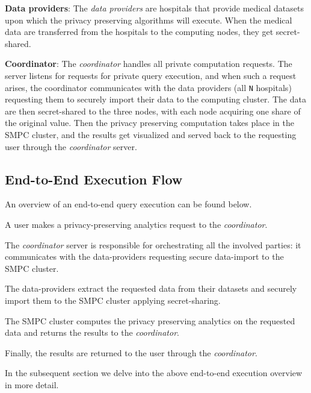 \textbf{Data providers}: The \textit{data providers} are hospitals that provide medical datasets upon which the privacy preserving algorithms will execute.
When the medical data are transferred from the hospitals to the computing nodes, they get secret\hyp shared.


\textbf{Coordinator}: The \textit{coordinator} handles all private computation requests.
The server listens for requests for private query execution, and when such a request arises, the coordinator communicates with the data providers (all \texttt{N} hospitals) requesting them to securely import their data to the computing cluster.
The data are then secret\hyp shared to the three nodes, with each node acquiring one share of the original value.
Then the privacy preserving computation takes place in the SMPC cluster, and the results get visualized and served back to the requesting user through the \textit{coordinator} server.


\subsection{End-to-End Execution Flow}\label{ss:end-to-end-execution-flow}

An overview of an end\hyp to\hyp end query execution can be found below.

\begin{description}[labelwidth=4em, leftmargin=\dimexpr\labelwidth+\labelsep\relax]
    \item [Step 1:] A user makes a privacy\hyp preserving analytics request to the \textit{coordinator}.
    \item [Step 2:] The \textit{coordinator} server is responsible for orchestrating all the involved parties: it communicates with the data\hyp providers requesting secure data\hyp import to the SMPC cluster.
    \item [Step 3:] The data\hyp providers extract the requested data from their datasets and securely import them to the SMPC cluster applying secret\hyp sharing.
    \item [Step 4:] The SMPC cluster computes the privacy preserving analytics on the requested data and returns the results to the \textit{coordinator}.
    \item [Step 5:] Finally, the results are returned to the user through the \textit{coordinator}.
\end{description}

In the subsequent section we delve into the above end\hyp to\hyp end execution overview in more detail.


